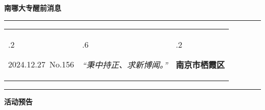 \documentclass[letterpaper, 12pt]{article}
\begin{document}
\begin{center}
    \Huge\textbf{南哪大专醒前消息}
\end{center}
\vspace{4mm}
\hrule
\renewcommand\tabularxcolumn[1]{m{#1}}
\begin{tabularx}{\textwidth}{>{\hsize.2\hsize}X>{\hsize.6\hsize}X>{\hsize.2\hsize}X}
    \begin{flushleft}
        2024.12.27\, No.156
    \end{flushleft}
    &
    \begin{center}
        \textit{“秉中持正、求新博闻。”}
    \end{center}
    &
    \begin{flushright}
        \textbf{南京市栖霞区}
    \end{flushright}
\end{tabularx}
\vspace{-3.5mm}
\hrule
\vspace{4mm}
\centerline{\huge\textbf{活动预告}}
\end{document}
